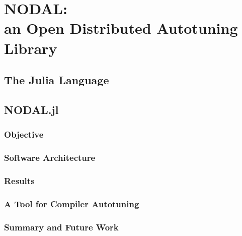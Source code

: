 \chapter[NODAL: an Open Distributed Autotuning Library]{NODAL: \\ an Open Distributed Autotuning Library}
\label{chap:julia}

\section{The Julia Language}
\label{sec:julia}

\section{NODAL.jl}
\label{sec:ss}

\subsection{Objective}
\label{subsec:obj}

\subsection{Software Architecture}
\label{subsec:arch}

\subsection{Results}
\label{subsec:res}

\subsection{A Tool for Compiler Autotuning}
\label{sec:stochastic-gpu-tuner}

\subsection{Summary and Future Work}
\label{subsec:concl}
